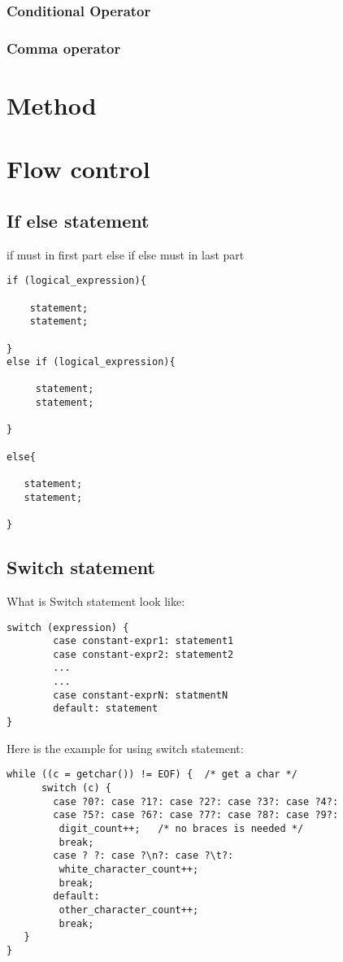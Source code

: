 \documentclass[a4paper]{article}
\begin{document}
\subsubsection{Conditional Operator}

\subsubsection{Comma operator}






\section{Method}


\section{Flow control}
\subsection{If else statement}
if must in first part
else if
else must in last part

\begin{lstlisting}
if (logical_expression){

    statement;
    statement;
    
}
else if (logical_expression){

     statement;
     statement;

}

else{

   statement;
   statement;
   
}
\end{lstlisting}

\subsection{Switch statement}
What is Switch statement look like:
\begin{lstlisting}
switch (expression) {
        case constant-expr1: statement1
        case constant-expr2: statement2
        ...
        ...
        case constant-exprN: statmentN
        default: statement
}

\end{lstlisting}

\begin{eg}
Here is the example for using switch statement:
\begin{lstlisting}
while ((c = getchar()) != EOF) {  /* get a char */
      switch (c) {
        case ?0?: case ?1?: case ?2?: case ?3?: case ?4?:
        case ?5?: case ?6?: case ?7?: case ?8?: case ?9?:
         digit_count++;   /* no braces is needed */
         break;
        case ? ?: case ?\n?: case ?\t?:
         white_character_count++;
         break;
        default:
         other_character_count++;
         break; 
   }
}
\end{lstlisting}
\end{eg}
\end{document}
